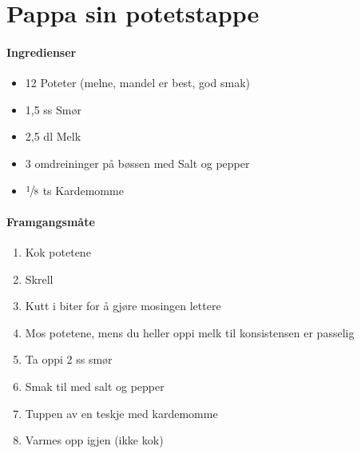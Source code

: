 \section{Pappa sin potetstappe}


\paragraph{Ingredienser}
\begin{itemize}[noitemsep]
	\item 12 Poteter (melne, mandel er best, god smak)
	\item 1,5 ss Smør
	\item 2,5 dl Melk
	\item 3 omdreininger på bøssen med Salt og pepper
	\item $\sfrac{1}{8}$ ts Kardemomme
\end{itemize}

\paragraph{Framgangsmåte}
\begin{enumerate}[noitemsep]
	\item Kok potetene
	\item Skrell
	\item Kutt i biter for å gjøre mosingen lettere
	\item Mos potetene, mens du heller oppi melk til konsistensen er passelig
	\item Ta oppi 2 ss smør
	\item Smak til med salt og pepper
	\item Tuppen av en teskje med kardemomme
	\item Varmes opp igjen (ikke kok)
\end{enumerate}
